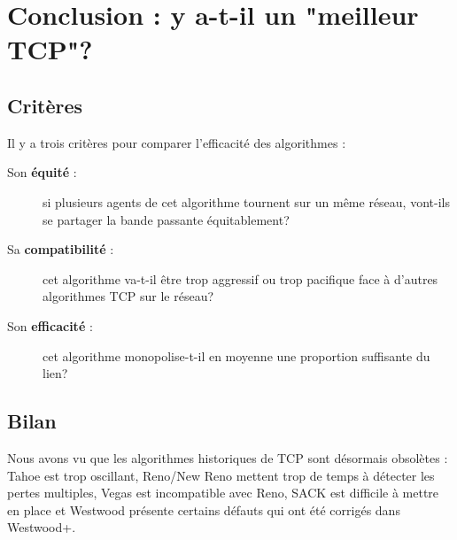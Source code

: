 \documentclass[	DIV=calc,%
							paper=a4,%
							fontsize=11pt,%
							twocolumn]{scrartcl}	 					%
\begin{document}
\section*{Conclusion : y a-t-il un "meilleur TCP"?}
\subsection*{Critères}
Il y a trois critères pour comparer l'efficacité des algorithmes :
\begin{description}
\item[Son \textbf{équité} :]{si plusieurs agents de cet algorithme tournent sur un même réseau, vont-ils se partager la bande passante équitablement?}
\item[Sa \textbf{compatibilité} :]{cet algorithme va-t-il être trop aggressif ou trop pacifique face à d'autres algorithmes TCP sur le réseau?}
\item[Son \textbf{efficacité} :]{cet algorithme monopolise-t-il en moyenne une proportion suffisante du lien?} 	
\end{description}
\subsection*{Bilan}
Nous avons vu que les algorithmes historiques de TCP sont désormais obsolètes : Tahoe est trop oscillant,  Reno/New Reno mettent trop de temps à détecter les pertes multiples,  Vegas est incompatible avec Reno, SACK est difficile à mettre en place et Westwood présente certains défauts qui ont été corrigés dans Westwood+.
\end{document}
